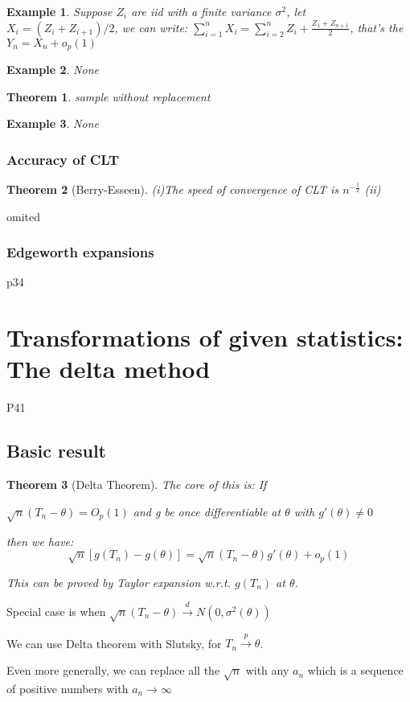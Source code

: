 \documentclass{ctexart}
\newtheorem{theorem}{Theorem}[subsection]
\newtheorem{example}{Example}[subsection]
\begin{document}
\begin{example}
  Suppose \(Z_{i}\) are iid with a finite variance \(\sigma^{2}\), let \(X_{i}=(Z_{i}+Z_{i+1})/2\), we can write: 
  \(\sum_{i=1}^{n} X_{i}=\sum_{i=2}^{n} Z_{i}+\frac{Z_{1}+Z_{n+1}}{2}\), that's the \(Y_n=X_{n}+o_p(1)\)     
\end{example}
\begin{example}
  None
\end{example}
\begin{theorem}
  sample without replacement
\end{theorem}
\begin{example}
  None
\end{example}
\subsubsection{Accuracy of CLT}
\begin{theorem}[Berry-Esseen]
  (i)The speed of convergence of CLT is \(n^{-\frac{1}{2}}\) 
  (ii)
\end{theorem}
omited
\subsubsection{Edgeworth expansions}
p34

\newpage
\section{Transformations of given statistics: The delta method}
P41
\subsection{Basic result}
\begin{theorem}[Delta Theorem]
  The core of this is: If

  \(\sqrt{n}(T_{n}-\theta)=O_{p}(1)\) and g be once differentiable at \(\theta\) with \(g'(\theta)\neq 0\)  
  
  then we have:   
  \[
  \sqrt{n}[g(T_{n})-g(\theta)]=\sqrt{n}(T_{n}-\theta)g'(\theta)+o_{p}(1)
  \] 
  
  This can be proved by Taylor expansion w.r.t. \(g(T_{n})\) at \(\theta\).  
\end{theorem}
Special case is when \(\sqrt{n}(T_{n}-\theta)\xrightarrow{d}N(0,\sigma^{2}(\theta))\) 

We can use Delta theorem with Slutsky, for \(T_{n}\xrightarrow{p}\theta\).  

Even more generally, we can replace all the \(\sqrt{n}\) with any \(a_{n}\) which is a sequence of positive numbers with \(a_{n}\to \infty\)   
\end{document}
